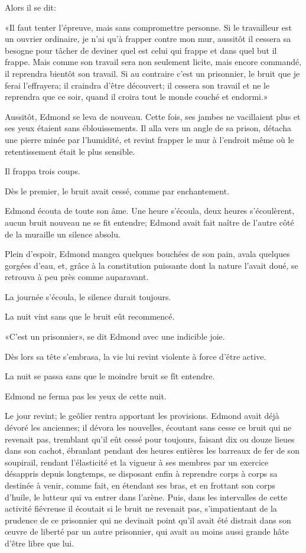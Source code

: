 Alors il se dit:

«Il faut tenter l'épreuve, mais sans compromettre personne. Si le travailleur est un ouvrier ordinaire, je n'ai qu'à frapper contre mon mur, aussitôt il cessera sa besogne pour tâcher de deviner quel est celui qui frappe et dans quel but il frappe. Mais comme son travail sera non seulement licite, mais encore commandé, il reprendra bientôt son travail. Si au contraire c'est un prisonnier, le bruit que je ferai l'effrayera; il craindra d'être découvert; il cessera son travail et ne le reprendra que ce soir, quand il croira tout le monde couché et endormi.»

Aussitôt, Edmond se leva de nouveau. Cette fois, ses jambes ne vacillaient plus et ses yeux étaient sans éblouissements. Il alla vers un angle de sa prison, détacha une pierre minée par l'humidité, et revint frapper le mur à l'endroit même où le retentissement était le plus sensible.

Il frappa trois coups.

Dès le premier, le bruit avait cessé, comme par enchantement.

Edmond écouta de toute son âme. Une heure s'écoula, deux heures s'écoulèrent, aucun bruit nouveau ne se fit entendre; Edmond avait fait naître de l'autre côté de la muraille un silence absolu.

Plein d'espoir, Edmond mangea quelques bouchées de son pain, avala quelques gorgées d'eau, et, grâce à la constitution puissante dont la nature l'avait doué, se retrouva à peu près comme auparavant.

La journée s'écoula, le silence durait toujours.

La nuit vint sans que le bruit eût recommencé.

«C'est un prisonnier», se dit Edmond avec une indicible joie.

Dès lors sa tête s'embrasa, la vie lui revint violente à force d'être active.

La nuit se passa sans que le moindre bruit se fît entendre.

Edmond ne ferma pas les yeux de cette nuit.

Le jour revint; le geôlier rentra apportant les provisions. Edmond avait déjà dévoré les anciennes; il dévora les nouvelles, écoutant sans cesse ce bruit qui ne revenait pas, tremblant qu'il eût cessé pour toujours, faisant dix ou douze lieues dans son cachot, ébranlant pendant des heures entières les barreaux de fer de son soupirail, rendant l'élasticité et la vigueur à ses membres par un exercice désappris depuis longtemps, se disposant enfin à reprendre corps à corps sa destinée à venir, comme fait, en étendant ses bras, et en frottant son corps d'huile, le lutteur qui va entrer dans l'arène. Puis, dans les intervalles de cette activité fiévreuse il écoutait si le bruit ne revenait pas, s'impatientant de la prudence de ce prisonnier qui ne devinait point qu'il avait été distrait dans son œuvre de liberté par un autre prisonnier, qui avait au moins aussi grande hâte d'être libre que lui.

